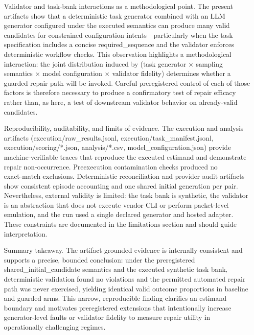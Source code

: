 \documentclass[conference]{IEEEtran}
\begin{document}
Validator and task‑bank interactions as a methodological point. The present artifacts show that a deterministic task generator combined with an LLM generator configured under the executed semantics can produce many valid candidates for constrained configuration intents---particularly when the task specification includes a concise required\_sequence and the validator enforces deterministic workflow checks. This observation highlights a methodological interaction: the joint distribution induced by (task generator \ensuremath{\times} sampling semantics \ensuremath{\times} model configuration \ensuremath{\times} validator fidelity) determines whether a guarded repair path will be invoked. Careful preregistered control of each of those factors is therefore necessary to produce a confirmatory test of repair efficacy rather than, as here, a test of downstream validator behavior on already‑valid candidates.

Reproducibility, auditability, and limits of evidence. The execution and analysis artifacts (execution/raw\_results.jsonl, execution/task\_manifest.jsonl, execution/scoring/*.json, analysis/*.csv, model\_configuration.json) provide machine‑verifiable traces that reproduce the executed estimand and demonstrate repair non‑occurrence. Preexecution contamination checks produced no exact‑match exclusions. Deterministic reconciliation and provider audit artifacts show consistent episode accounting and one shared initial generation per pair. Nevertheless, external validity is limited: the task bank is synthetic, the validator is an abstraction that does not execute vendor CLI or perform packet‑level emulation, and the run used a single declared generator and hosted adapter. These constraints are documented in the limitations section and should guide interpretation.

Summary takeaway. The artifact‑grounded evidence is internally consistent and supports a precise, bounded conclusion: under the preregistered shared\_initial\_candidate semantics and the executed synthetic task bank, deterministic validation found no violations and the permitted automated repair path was never exercised, yielding identical valid outcome proportions in baseline and guarded arms. This narrow, reproducible finding clarifies an estimand boundary and motivates preregistered extensions that intentionally increase generator‑level faults or validator fidelity to measure repair utility in operationally challenging regimes.
\end{document}
